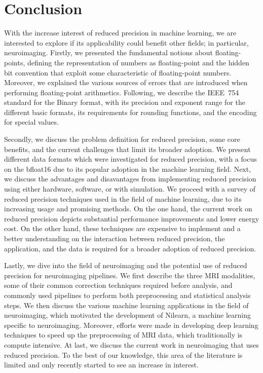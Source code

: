 \chapter{Conclusion}
\label{ch:conclusion}
With the increase interest of reduced precision in machine learning, we are interested
to explore if its applicability could benefit other fields; in particular, neuroimaging.
Firstly, we presented the fundamental notions about floating-points, defining the representation
of numbers as floating-point and the hidden bit convention that exploit some characteristic
of floating-point numbers.
Moreover, we explained the various sources of errors that are introduced when performing
floating-point arithmetics.
Following, we describe the IEEE~754 standard for the Binary format, with its 
precision and exponent range for the different basic formats, its requirements
for rounding functions, and the encoding for special values.

Secondly, we discuss the problem definition for reduced precision, some core benefits,
and the current challenges that limit its broader adoption.
We present different data formats which were investigated for reduced precision, 
with a focus on the bfloat16 due to its popular adoption in the machine learning field.
Next, we discuss the advantages and disavantages from implementing reduced precision 
using either hardware, software, or with simulation.
We proceed with a survey of reduced precision techniques used in the field of 
machine learning, due to its increasing usage and promising methods.
On the one hand, the current work on reduced precision depicts substantial 
performance improvements and lower energy cost.
On the other hand, these techniques are expensive to implement and a better 
understanding on the interaction between reduced precision, the application, and
the data is required for a broader adoption of reduced precision.

Lastly, we dive into the field of neuroimaging and the potential use of reduced 
precision for neuroimaging pipelines.
We first describe the three MRI modalities, some of their common correction techniques
required before analysis, and commonly used pipelines to perform both preprocessing and
statistical analysis steps.
We then discuss the various machine learning applications in the field of neuroimaging,
which motivated the development of Nilearn, a machine learning specific to neuroimaging.
Moreover, efforts were made in developing deep learning techniques to speed up 
the preprocessing of MRI data, which traditionally is compute intensive.
At last, we discuss the current work in neuroimaging that uses reduced precision.
To  the best of our knowledge, this area of the literature is limited and only recently
started to see an increase in interest.

